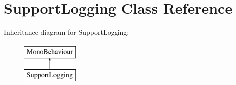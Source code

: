 \hypertarget{class_support_logging}{}\section{Support\+Logging Class Reference}
\label{class_support_logging}
Inheritance diagram for Support\+Logging\+:\begin{figure}[H]
\begin{center}
\leavevmode
\includegraphics[height=2.000000cm]{class_support_logging}
\end{center}
\end{figure}
